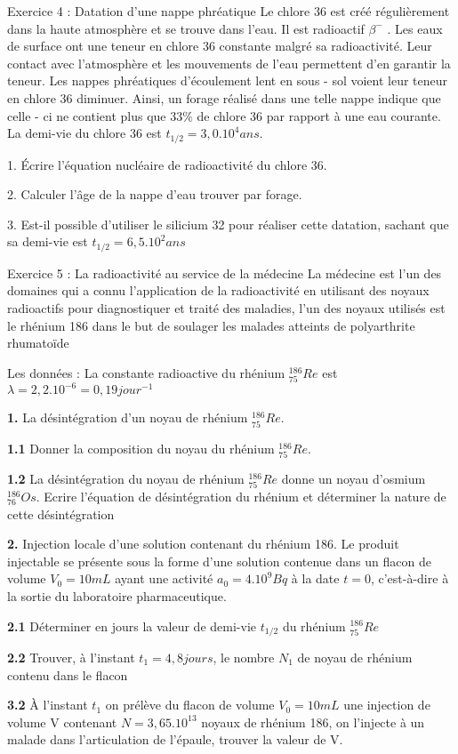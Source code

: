 \documentclass[12pt, french]{article}
\begin{document}
\begin{Box2}{Exercice 4 : Datation d’une nappe phréatique}
Le chlore 36 est créé régulièrement dans la haute atmosphère et se trouve dans l’eau. Il est radioactif
 $\beta^-$ . Les eaux de surface ont une teneur en chlore 36 constante malgré sa radioactivité. Leur contact
avec
l’atmosphère et les mouvements de l’eau permettent d’en garantir la teneur. Les nappes phréatiques
d’écoulement lent en sous - sol voient leur teneur en chlore 36 diminuer. Ainsi, un forage réalisé dans
une telle nappe indique que celle - ci ne contient plus que $33\%$ de chlore 36 par rapport à une eau
courante. La demi-vie du chlore 36 est $t_{1/2} = 3,0.10^4ans$.

1. Écrire l’équation nucléaire de radioactivité du chlore 36.

2. Calculer l’âge de la nappe d’eau trouver par forage.

3. Est-il possible d’utiliser le silicium 32 pour réaliser cette datation, sachant que sa demi-vie est
$t_{1/2}=6,5.10^2ans$
\end{Box2}
\begin{Box2}{Exercice 5 : La radioactivité au service de la médecine}
La médecine est l’un des domaines qui a connu l’application de la radioactivité en utilisant des noyaux
radioactifs pour diagnostiquer et traité des maladies, l’un des noyaux utilisés est le rhénium 186 dans
le but de soulager les malades atteints de polyarthrite rhumatoïde

Les données : La constante radioactive du rhénium $_{75}^{186}Re$ est $\lambda = 2,2.10^{-6}= 0,19jour^{-1}$

\textbf{1. }La désintégration d’un noyau de rhénium $_{75}^{186}Re$.

\textbf{1.1 }Donner la composition du noyau du rhénium $_{75}^{186}Re$.

\textbf{1.2 }La désintégration du noyau de rhénium $_{75}^{186}Re$ donne un noyau d’osmium $_{76}^{186}Os$.
Ecrire
l’équation de désintégration du rhénium et déterminer la nature de cette désintégration

\textbf{2. }Injection locale d’une solution contenant du rhénium 186.
Le produit injectable se présente sous la forme d’une solution contenue dans un flacon de volume $V_0= 10 mL$ ayant une activité $a_0 = 4.10^9Bq$ à la date $t=0$, c'est-à-dire à la sortie du laboratoire pharmaceutique.

\textbf{2.1 }Déterminer en jours la valeur de demi-vie $t_{1/2}$ du rhénium $_{75}^{186}Re$

\textbf{2.2 }Trouver, à l’instant $t_1 = 4,8jours$, le nombre $N_1$ de noyau de rhénium contenu dans le flacon

\textbf{3.2 } À l’instant $t_1$ on prélève du flacon de volume $V_0 = 10mL$ une injection de volume V contenant $N = 3,65.10^{13}$ noyaux de rhénium 186, on l’injecte à un malade dans l’articulation de l’épaule, trouver la valeur de V.


\end{Box2}
\end{document}
